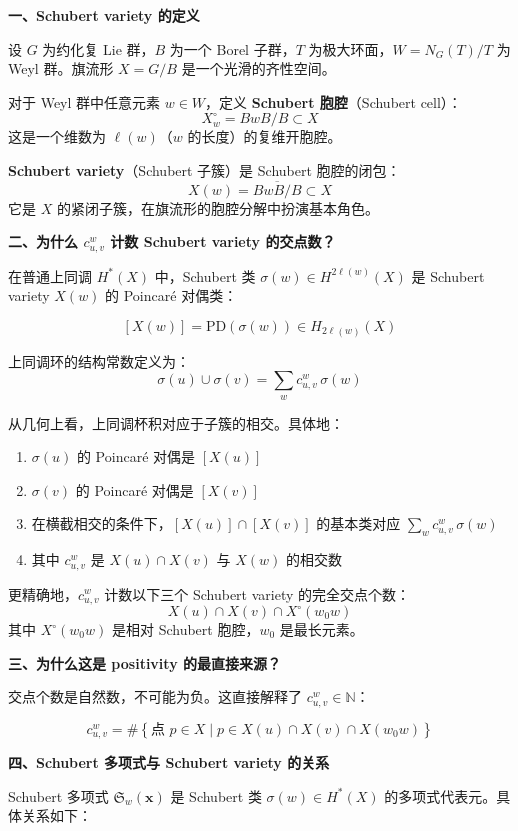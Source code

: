 \textbf{一、Schubert variety 的定义}

设 $G$ 为约化复 Lie 群，$B$ 为一个 Borel 子群，$T$ 为极大环面，$W = N_G(T)/T$ 为 Weyl 群。旗流形 $X = G/B$ 是一个光滑的齐性空间。

对于 Weyl 群中任意元素 $w \in W$，定义 \textbf{Schubert 胞腔}（Schubert cell）：
$$X_w^\circ = BwB/B \subset X$$
这是一个维数为 $\ell(w)$（$w$ 的长度）的复维开胞腔。

\textbf{Schubert variety}（Schubert 子簇）是 Schubert 胞腔的闭包：
$$X(w) = \overline{BwB/B} \subset X$$
它是 $X$ 的紧闭子簇，在旗流形的胞腔分解中扮演基本角色。

\textbf{二、为什么 $c_{u,v}^w$ 计数 Schubert variety 的交点数？}

在普通上同调 $H^*(X)$ 中，Schubert 类 $\sigma(w) \in H^{2\ell(w)}(X)$ 是 Schubert variety $X(w)$ 的 Poincaré 对偶类：

$$[X(w)] = \text{PD}(\sigma(w)) \in H_{2\ell(w)}(X)$$

上同调环的结构常数定义为：
$$\sigma(u) \cup \sigma(v) = \sum_w c_{u,v}^w \, \sigma(w)$$

从几何上看，上同调杯积对应于子簇的相交。具体地：

\begin{enumerate}
\item $\sigma(u)$ 的 Poincaré 对偶是 $[X(u)]$
\item $\sigma(v)$ 的 Poincaré 对偶是 $[X(v)]$
\item 在横截相交的条件下，$[X(u)] \cap [X(v)]$ 的基本类对应 $\sum_w c_{u,v}^w \, \sigma(w)$
\item 其中 $c_{u,v}^w$ 是 $X(u) \cap X(v)$ 与 $X(w)$ 的相交数
\end{enumerate}

更精确地，$c_{u,v}^w$ 计数以下三个 Schubert variety 的完全交点个数：
$$X(u) \cap X(v) \cap X^\circ(w_0 w)$$
其中 $X^\circ(w_0 w)$ 是相对 Schubert 胞腔，$w_0$ 是最长元素。

\textbf{三、为什么这是 positivity 的最直接来源？}

交点个数是自然数，不可能为负。这直接解释了 $c_{u,v}^w \in \mathbb{N}$：

$$c_{u,v}^w = \#\left\{ \text{点 } p \in X \mid p \in X(u) \cap X(v) \cap X(w_0w) \right\}$$

\textbf{四、Schubert 多项式与 Schubert variety 的关系}

Schubert 多项式 $\mathfrak{S}_w(\mathbf{x})$ 是 Schubert 类 $\sigma(w) \in H^*(X)$ 的多项式代表元。具体关系如下：

